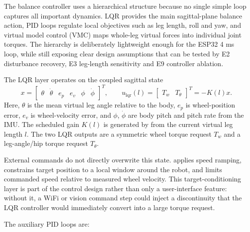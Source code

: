 \documentclass[12pt, a4paper]{article}
\begin{document}
The balance controller uses a hierarchical structure because no single simple loop captures all important dynamics. LQR provides the main sagittal-plane balance action, PID loops regulate local objectives such as leg length, roll and yaw, and virtual model control (VMC) maps whole-leg virtual forces into individual joint torques. The hierarchy is deliberately lightweight enough for the ESP32 4 ms loop, while still exposing clear design assumptions that can be tested by E2 disturbance recovery, E3 leg-length sensitivity and E9 controller ablation.

The LQR layer operates on the coupled sagittal state
\[
x =
\begin{bmatrix}
\theta & \dot{\theta} & e_p & e_v & \phi & \dot{\phi}
\end{bmatrix}^{T},
\qquad
u_{\mathrm{lqr}}(l) =
\begin{bmatrix}
T_w & T_\theta
\end{bmatrix}^{T}
= -K(l)x .
\]
Here, \(\theta\) is the mean virtual leg angle relative to the body, \(e_p\) is wheel-position error, \(e_v\) is wheel-velocity error, and \(\phi\), \(\dot{\phi}\) are body pitch and pitch rate from the IMU. The scheduled gain \(K(l)\) is generated by \texttt{} from the current virtual leg length \(l\). The two LQR outputs are a symmetric wheel torque request \(T_w\) and a leg-angle/hip torque request \(T_\theta\).

External commands do not directly overwrite this state. \texttt{} applies speed ramping, constrains target position to a local window around the robot, and limits commanded speed relative to measured wheel velocity. This target-conditioning layer is part of the control design rather than only a user-interface feature: without it, a WiFi or vision command step could inject a discontinuity that the LQR controller would immediately convert into a large torque request.

The auxiliary PID loops are:
\end{document}
